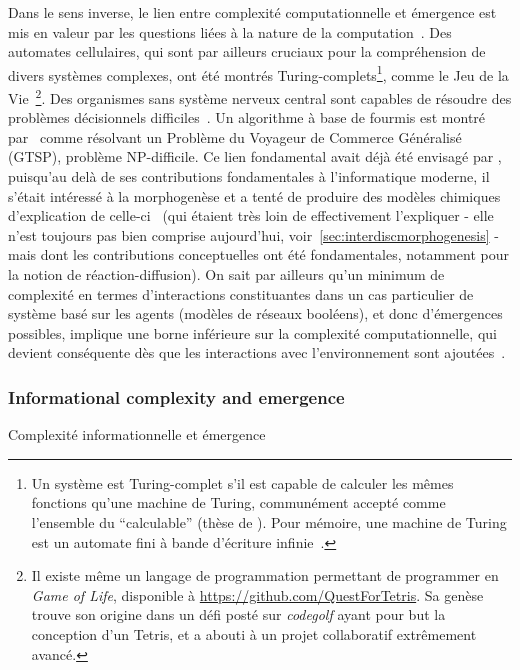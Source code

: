 {Dans le sens inverse, le lien entre complexité computationnelle et émergence est mis en valeur par les questions liées à la nature de la computation~\cite{moore2011nature}. Des automates cellulaires, qui sont par ailleurs cruciaux pour la compréhension de divers systèmes complexes, ont été montrés Turing-complets\footnote{Un système est Turing-complet s'il est capable de calculer les mêmes fonctions qu'une machine de Turing, communément accepté comme l'ensemble du ``calculable'' (thèse de ). Pour mémoire, une machine de Turing est un automate fini à bande d'écriture infinie~\cite{moore2011nature}.}, comme le Jeu de la Vie~\cite{beer2004autopoiesis}\footnote{Il existe même un langage de programmation permettant de programmer en \emph{Game of Life}, disponible à \url{https://github.com/QuestForTetris}. Sa genèse trouve son origine dans un défi posté sur \emph{codegolf} ayant pour but la conception d'un Tetris, et a abouti à un projet collaboratif extrêmement avancé.}. Des organismes sans système nerveux central sont capables de résoudre des problèmes décisionnels difficiles~\cite{reid2016decision}. Un algorithme à base de fourmis est montré par~\cite{Pintea2017} comme résolvant un Problème du Voyageur de Commerce Généralisé (GTSP), problème NP-difficile. Ce lien fondamental avait déjà été envisagé par , puisqu'au delà de ses contributions fondamentales à l'informatique moderne, il s'était intéressé à la morphogenèse et a tenté de produire des modèles chimiques d'explication de celle-ci~\cite{turing1952chemical} (qui étaient très loin de effectivement l'expliquer - elle n'est toujours pas bien comprise aujourd'hui, voir~\ref{sec:interdiscmorphogenesis} - mais dont les contributions conceptuelles ont été fondamentales, notamment pour la notion de réaction-diffusion). On sait par ailleurs qu'un minimum de complexité en termes d'interactions constituantes dans un cas particulier de système basé sur les agents (modèles de réseaux booléens), et donc d'émergences possibles, implique une borne inférieure sur la complexité computationnelle, qui devient conséquente dès que les interactions avec l'environnement sont ajoutées~\cite{tovsic2017boolean}.
}




\subsubsection{Informational complexity and emergence}{Complexité informationnelle et émergence}


